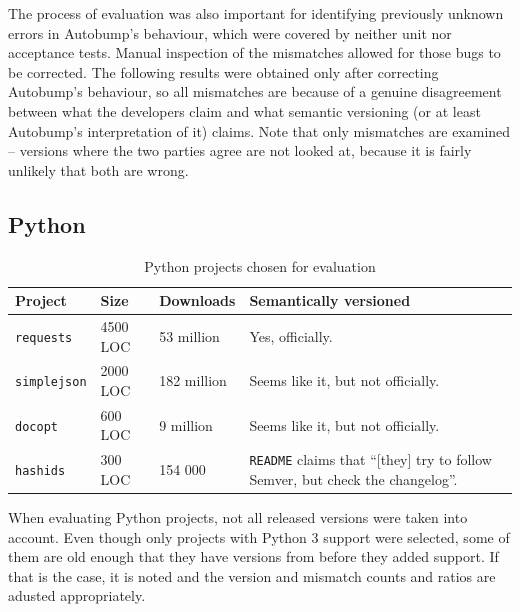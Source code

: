 \documentclass{l4proj}
\newcommand\genericstyle{\lstset{basicstyle=\ttm}}
\newcommand\codeinline[1]{{\genericstyle\lstinline!#1!}}
\begin{document}
The process of evaluation was also important for identifying
previously unknown errors in Autobump's behaviour, which were covered
by neither unit nor acceptance tests. Manual inspection of the
mismatches allowed for those bugs to be corrected. The following
results were obtained only after correcting Autobump's behaviour, so
all mismatches are because of a genuine disagreement between what the
developers claim and what semantic versioning (or at least Autobump's
interpretation of it) claims. Note that only mismatches are examined
-- versions where the two parties agree are not looked at, because it
is fairly unlikely that both are wrong.


\subsection{Python}

\begin{table}[H]
\centering
\begin{tabular}{|l|l|l|p{10cm}|}
\hline
\textbf{Project} & \textbf{Size} & \textbf{Downloads} & \textbf{Semantically versioned} \\
\hline
\codeinline{requests} & 4500 LOC & 53 million & Yes, officially. \\
\codeinline{simplejson} & 2000 LOC & 182 million & Seems like it, but not officially. \\
\codeinline{docopt} & 600 LOC & 9 million & Seems like it, but not
officially. \\
\codeinline{hashids} & 300 LOC & 154 000 & \codeinline{README} claims
that ``[they] try to follow Semver, but check the changelog''. \\
\hline
\end{tabular}
\caption{Python projects chosen for evaluation}
\label{PythonProjectsForEvaluation}
\end{table}

When evaluating Python projects, not all released versions were taken
into account. Even though only projects with Python 3 support were
selected, some of them are old enough that they have versions from
before they added support. If that is the case, it is noted and the
version and mismatch counts and ratios are adusted appropriately.
\end{document}
